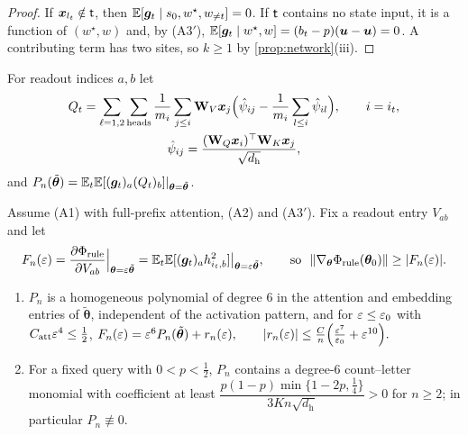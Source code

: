 \begin{proof}
If $\bm x_{l_t}\notin\mathsf t$, then $\mathbb E[\bm g_t\mid s_0,w^\star,w_{\ne t}]=0$. If $\mathsf t$ contains no state input, it is a function of $(w^\star,w)$ and, by (A3$'$),
$\mathbb E[\bm g_t\mid w^\star,w]=(b_t-p)(\bm u-\bm u)=0$. A contributing term has two sites, so $k\ge1$ by \cref{prop:network}(iii).
\end{proof}

For readout indices $a,b$ let
\begin{gather*}
 Q_t=\sum_{\ell=1,2}\sum_{\mathrm{heads}}\frac{1}{m_i}\sum_{j\le i}\mathbf W_V\bm x_j\Bigl(\hat\psi_{ij}-\frac{1}{m_i}\sum_{l\le i}\hat\psi_{il}\Bigr),\qquad i=i_t,\\
 \hat\psi_{ij}=\frac{(\mathbf W_Q\bm x_i)^\top\mathbf W_K\bm x_j}{\sqrt{d_{\mathrm h}}},
\end{gather*}
and $P_n(\tilde{\bm\theta})=\mathbb E_t\mathbb E[(\bm g_t)_a(Q_t)_b]|_{\bm\theta=\tilde{\bm\theta}}$.

\begin{lemma}
\label{lem:leading}
Assume (A1) with full-prefix attention, (A2) and (A3$'$). Fix a readout entry $V_{ab}$ and let
\[
 F_n(\initscale)=\pd{\rulecredit}{V_{ab}}\Big|_{\bm\theta=\initscale\tilde{\bm\theta}}=\E_t\E[(\bm g_t)_ah^2_{i_t,b}]\big|_{\bm\theta=\initscale\tilde{\bm\theta}},\qquad\text{so }\ \|\nabla_{\bm\theta}\rulecredit(\bm\theta_0)\|\ge|F_n(\initscale)|.
\]
\begin{enumerate}[label=(\roman*),leftmargin=*,itemsep=0pt,topsep=2pt]
\item $P_n$ is a homogeneous polynomial of degree $6$ in the attention and embedding entries of $\tilde{\bm\theta}$, independent of the activation
pattern, and for $\varepsilon\le\varepsilon_0$ with $C_{\mathrm{att}}\varepsilon^4\le\frac{1}{2}$,
 $F_n(\varepsilon)=\varepsilon^6P_n(\tilde{\bm\theta})+r_n(\varepsilon),\qquad |r_n(\varepsilon)|\le\frac{C}{n}\Bigl(\frac{\varepsilon^7}{\varepsilon_0}+\varepsilon^{10}\Bigr).$ 
\item For a fixed query with $0<p<\frac{1}{2}$, $P_n$ contains a degree-$6$ count--letter monomial with coefficient at least
$\dfrac{p(1-p)\min\{1-2p,\frac{1}{4}\}}{3Kn\sqrt{d_{\mathrm h}}}>0$ for $n\ge2$; in particular $P_n\not\equiv0$.
\end{enumerate}
\end{lemma}

